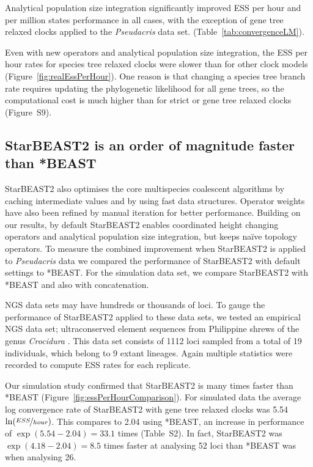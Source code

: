 \documentclass[12pt]{article}
\begin{document}
Analytical population size integration significantly improved ESS per hour and
per million states performance in all cases, with the exception of gene tree
relaxed clocks applied to the \textit{Pseudacris} data set.
(Table~\ref{tab:convergenceLM}).

Even with new operators and analytical population size integration, the ESS
per hour rates for species tree relaxed clocks were slower than for other
clock models (Figure~\ref{fig:realEssPerHour}). One reason is that changing a
species tree branch rate requires updating the phylogenetic likelihood for all
gene trees, so the computational cost is much higher than for strict or gene
tree relaxed clocks (Figure~S9).

\subsection{StarBEAST2 is an order of magnitude faster than *BEAST}

StarBEAST2 also optimises the core multispecies coalescent algorithms by
caching intermediate values and by using fast data structures. Operator
weights have also been refined by manual iteration for better performance.
Building on our results, by default StarBEAST2 enables coordinated height
changing operators and analytical population size integration, but keeps
na\"ive topology operators. To measure the combined improvement when
StarBEAST2 is applied to \textit{Pseudacris} data we compared the performance
of StarBEAST2 with default settings to *BEAST. For the simulation data set, we
compare StarBEAST2 with *BEAST and also with concatenation.

NGS data sets may have hundreds or thousands of loci. To gauge the performance
of StarBEAST2 applied to these data sets, we tested an empirical NGS data set;
ultraconserved element \citep[UCE;][]{Faircloth01102012} sequences from
Philippine shrews of the genus \textit{Crocidura} \citep{Giarla01092015}. This
data set consists of 1112 loci sampled from a total of 19 individuals, which
belong to 9 extant lineages. Again multiple statistics were recorded to
compute ESS rates for each replicate.

Our simulation study confirmed that StarBEAST2 is many times faster than
*BEAST (Figure~\ref{fig:essPerHourComparison}). For simulated data the average
log convergence rate of StarBEAST2 with gene tree relaxed clocks was 5.54
$\ln(\nicefrac{ESS}{hour})$. This compares to 2.04 using *BEAST, an
increase in performance of $\exp(5.54 - 2.04) = 33.1$ times (Table~S2). In
fact, StarBEAST2 was
$\exp(4.18 - 2.04) = 8.5$ times faster at analysing 52 loci than *BEAST
was when analysing 26.
\end{document}
